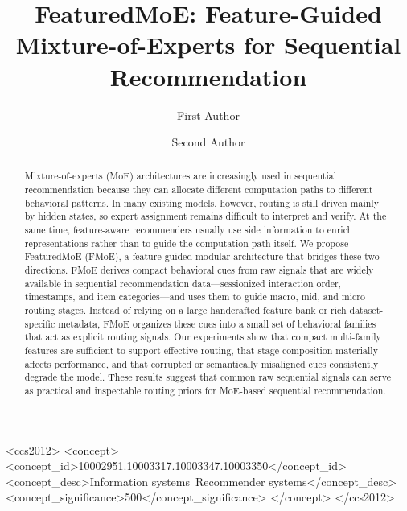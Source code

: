 \documentclass[sigconf,anonymous,review]{acmart}
\begin{document}
\title[FeaturedMoE for Sequential Recommendation]{FeaturedMoE: Feature-Guided Mixture-of-Experts for Sequential Recommendation}

\author{First Author}

\author{Second Author}

\renewcommand{\shortauthors}{Author et al.}

\begin{abstract}
Mixture-of-experts (MoE) architectures are increasingly used in sequential recommendation because they can allocate different computation paths to different behavioral patterns. In many existing models, however, routing is still driven mainly by hidden states, so expert assignment remains difficult to interpret and verify. At the same time, feature-aware recommenders usually use side information to enrich representations rather than to guide the computation path itself. We propose FeaturedMoE (FMoE), a feature-guided modular architecture that bridges these two directions. FMoE derives compact behavioral cues from raw signals that are widely available in sequential recommendation data---sessionized interaction order, timestamps, and item categories---and uses them to guide macro, mid, and micro routing stages. Instead of relying on a large handcrafted feature bank or rich dataset-specific metadata, FMoE organizes these cues into a small set of behavioral families that act as explicit routing signals. Our experiments show that compact multi-family features are sufficient to support effective routing, that stage composition materially affects performance, and that corrupted or semantically misaligned cues consistently degrade the model. These results suggest that common raw sequential signals can serve as practical and inspectable routing priors for MoE-based sequential recommendation.
\end{abstract}

\begin{CCSXML}
<ccs2012>
 <concept>
  <concept_id>10002951.10003317.10003347.10003350</concept_id>
  <concept_desc>Information systems~Recommender systems</concept_desc>
  <concept_significance>500</concept_significance>
 </concept>
</ccs2012>
\end{CCSXML}
\end{document}
